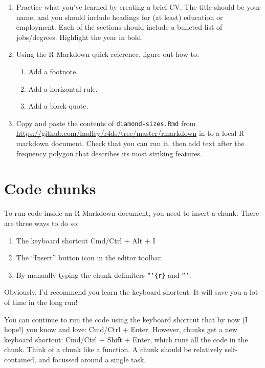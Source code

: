 \documentclass[]{book}
\providecommand{\tightlist}{%
  \setlength{\itemsep}{0pt}\setlength{\parskip}{0pt}}
\begin{document}
\begin{enumerate}
\def\labelenumi{\arabic{enumi}.}
\item
  Practice what you've learned by creating a brief CV. The title should
  be your name, and you should include headings for (at least) education
  or employment. Each of the sections should include a bulleted list of
  jobs/degrees. Highlight the year in bold.
\item
  Using the R Markdown quick reference, figure out how to:

  \begin{enumerate}
  \def\labelenumii{\arabic{enumii}.}
  \tightlist
  \item
    Add a footnote.
  \item
    Add a horizontal rule.
  \item
    Add a block quote.
  \end{enumerate}
\item
  Copy and paste the contents of \texttt{diamond-sizes.Rmd} from
  \url{https://github.com/hadley/r4ds/tree/master/rmarkdown} in to a
  local R markdown document. Check that you can run it, then add text
  after the frequency polygon that describes its most striking features.
\end{enumerate}

\section{Code chunks}\label{code-chunks}

To run code inside an R Markdown document, you need to insert a chunk.
There are three ways to do so:

\begin{enumerate}
\def\labelenumi{\arabic{enumi}.}
\item
  The keyboard shortcut Cmd/Ctrl + Alt + I
\item
  The ``Insert'' button icon in the editor toolbar.
\item
  By manually typing the chunk delimiters \texttt{```\{r\}} and
  \texttt{```}.
\end{enumerate}

Obviously, I'd recommend you learn the keyboard shortcut. It will save
you a lot of time in the long run!

You can continue to run the code using the keyboard shortcut that by now
(I hope!) you know and love: Cmd/Ctrl + Enter. However, chunks get a new
keyboard shortcut: Cmd/Ctrl + Shift + Enter, which runs all the code in
the chunk. Think of a chunk like a function. A chunk should be
relatively self-contained, and focussed around a single task.
\end{document}
